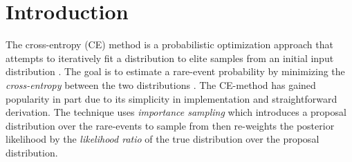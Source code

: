 

\section{Introduction}
The cross-entropy (CE) method is a probabilistic optimization approach that attempts to iteratively fit a distribution to elite samples from an initial input distribution \cite{rubinstein2004cross,rubinstein1999cross}.
The goal is to estimate a rare-event probability by minimizing the \textit{cross-entropy} between the two distributions \cite{de2005tutorial}.
The CE-method has gained popularity in part due to its simplicity in implementation and straightforward derivation.
The technique uses \textit{importance sampling} which introduces a proposal distribution over the rare-events to sample from then re-weights the posterior likelihood by the \textit{likelihood ratio} of the true distribution over the proposal distribution.

